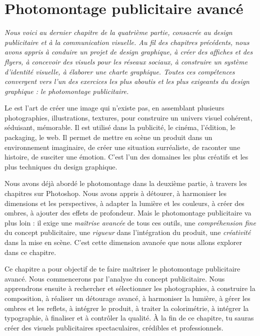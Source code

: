 
\chapter{Photomontage publicitaire avancé}

\noindent
\textit{Nous voici au dernier chapitre de la quatrième partie, consacrée au design publicitaire et à la communication visuelle. Au fil des chapitres précédents, nous avons appris à conduire un projet de design graphique, à créer des affiches et des flyers, à concevoir des visuels pour les réseaux sociaux, à construire un système d'identité visuelle, à élaborer une charte graphique. Toutes ces compétences convergent vers l'un des exercices les plus aboutis et les plus exigeants du design graphique : le \emph{photomontage publicitaire}.}

\vspace{1em}

\noindent
Le  est l'art de créer une image qui n'existe pas, en assemblant plusieurs photographies, illustrations, textures, pour construire un univers visuel cohérent, séduisant, mémorable. Il est utilisé dans la publicité, le cinéma, l'édition, le packaging, le web. Il permet de mettre en scène un produit dans un environnement imaginaire, de créer une situation surréaliste, de raconter une histoire, de susciter une émotion. C'est l'un des domaines les plus créatifs et les plus techniques du design graphique.

\vspace{1em}

\noindent
Nous avons déjà abordé le photomontage dans la deuxième partie, à travers les chapitres sur Photoshop. Nous avons appris à détourer, à harmoniser les dimensions et les perspectives, à adapter la lumière et les couleurs, à créer des ombres, à ajouter des effets de profondeur. Mais le photomontage publicitaire va plus loin : il exige une \emph{maîtrise avancée} de tous ces outils, une \emph{compréhension fine} du concept publicitaire, une \emph{rigueur} dans l'intégration du produit, une \emph{créativité} dans la mise en scène. C'est cette dimension avancée que nous allons explorer dans ce chapitre.

\vspace{1em}

\noindent
Ce chapitre a pour objectif de te faire maîtriser le photomontage publicitaire avancé. Nous commencerons par l'analyse du concept publicitaire. Nous apprendrons ensuite à rechercher et sélectionner les photographies, à construire la composition, à réaliser un détourage avancé, à harmoniser la lumière, à gérer les ombres et les reflets, à intégrer le produit, à traiter la colorimétrie, à intégrer la typographie, à finaliser et à contrôler la qualité. À la fin de ce chapitre, tu sauras créer des visuels publicitaires spectaculaires, crédibles et professionnels.

